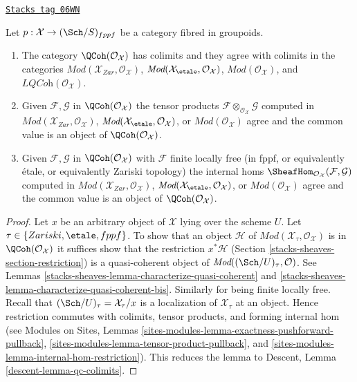\begin{lemma}[Qc colimits]
\label{stacks-sheaves-lemma-qc-colimits}
\href{https://stacks.math.columbia.edu/tag/06WN}{\texttt{Stacks tag 06WN}}

Let $p : \mathcal{X} \to (\Sch/S)_{fppf}$ be a category
fibred in groupoids.
\begin{enumerate}
\item The category $\QCoh(\mathcal{O}_\mathcal{X})$
has colimits and they agree with colimits in the categories
$\textit{Mod}(\mathcal{X}_{Zar}, \mathcal{O}_\mathcal{X})$,
$\textit{Mod}(\mathcal{X}_\etale, \mathcal{O}_\mathcal{X})$,
$\textit{Mod}(\mathcal{O}_\mathcal{X})$, and
$\textit{LQCoh}(\mathcal{O}_\mathcal{X})$.
\item Given $\mathcal{F}, \mathcal{G}$ in $\QCoh(\mathcal{O}_\mathcal{X})$
the tensor products $\mathcal{F} \otimes_{\mathcal{O}_\mathcal{X}} \mathcal{G}$
computed in $\textit{Mod}(\mathcal{X}_{Zar}, \mathcal{O}_\mathcal{X})$,
$\textit{Mod}(\mathcal{X}_\etale, \mathcal{O}_\mathcal{X})$, or
$\textit{Mod}(\mathcal{O}_\mathcal{X})$ agree and the common value
is an object of $\QCoh(\mathcal{O}_\mathcal{X})$.
\item Given $\mathcal{F}, \mathcal{G}$ in $\QCoh(\mathcal{O}_\mathcal{X})$
with $\mathcal{F}$ finite locally free (in fppf, or equivalently \'etale, or
equivalently Zariski topology) the internal homs
$\SheafHom_{\mathcal{O}_\mathcal{X}}(\mathcal{F}, \mathcal{G})$
computed in $\textit{Mod}(\mathcal{X}_{Zar}, \mathcal{O}_\mathcal{X})$,
$\textit{Mod}(\mathcal{X}_\etale, \mathcal{O}_\mathcal{X})$, or
$\textit{Mod}(\mathcal{O}_\mathcal{X})$ agree and the common value
is an object of $\QCoh(\mathcal{O}_\mathcal{X})$.
\end{enumerate}
\end{lemma}

\begin{proof}
Let $x$ be an arbitrary object of $\mathcal{X}$ lying over the scheme $U$.
Let $\tau \in \{Zariski, \etale, fppf\}$. To show that an object $\mathcal{H}$
of $\textit{Mod}(\mathcal{X}_\tau, \mathcal{O}_\mathcal{X})$ is
in $\QCoh(\mathcal{O}_\mathcal{X})$ it suffices show that the
restriction $x^*\mathcal{H}$ (Section \ref{stacks-sheaves-section-restriction})
is a quasi-coherent object of $\textit{Mod}((\Sch/U)_\tau, \mathcal{O})$.
See Lemmas \ref{stacks-sheaves-lemma-characterize-quasi-coherent} and
\ref{stacks-sheaves-lemma-characterize-quasi-coherent-bis}. Similarly for being
finite locally free. Recall that $(\Sch/U)_\tau = \mathcal{X}_\tau/x$
is a localization of $\mathcal{X}_\tau$ at an object. Hence restriction
commutes with colimits, tensor products, and forming internal hom
(see Modules on Sites, Lemmas
\ref{sites-modules-lemma-exactness-pushforward-pullback},
\ref{sites-modules-lemma-tensor-product-pullback}, and
\ref{sites-modules-lemma-internal-hom-restriction}).
This reduces the lemma to Descent, Lemma \ref{descent-lemma-qc-colimits}.
\end{proof}


